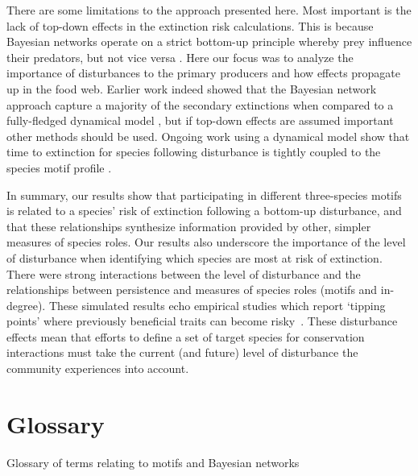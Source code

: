 \documentclass[12pt]{article}
\begin{document}
\begin{spacing}{2.0}
There are some limitations to the approach presented here. Most important is the lack of top-down effects in the extinction risk calculations. This is because Bayesian networks operate on a strict bottom-up principle whereby prey influence their predators, but not vice versa \citep{Eklof2013}. Here our focus was to analyze the importance of disturbances to the primary producers and how effects propagate up in the food web. Earlier work indeed showed that the Bayesian network approach capture a majority of the secondary extinctions when compared to a fully-fledged dynamical model \citep{Eklof2013}, but if top-down effects are assumed important other methods should be used. Ongoing work using a dynamical model show that time to extinction for species following disturbance is tightly coupled to the species motif profile \citep{Cirtwill2021_inprep}. 

In summary, our results show that participating in different three-species motifs is related to a species' risk of extinction following a bottom-up disturbance, and that these relationships synthesize information provided by other, simpler measures of species roles.
Our results also underscore the importance of the level of disturbance when identifying which species are most at risk of extinction.
There were strong interactions between the level of disturbance and the relationships between persistence and measures of species roles (motifs and in-degree).
These simulated results echo empirical studies which report `tipping points' where previously beneficial traits can become risky~\citep{}.
These disturbance effects mean that efforts to define a set of target species for conservation interactions must take the current (and future) level of disturbance the community experiences into account.


\clearpage    

\section*{Glossary}

\begin{table}[h!]
\label{glossary}
\caption{Glossary of terms relating to motifs and Bayesian networks}


\end{table}
\end{spacing}
\end{document}
